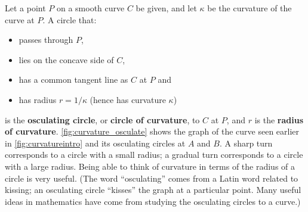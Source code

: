 Let a point $P$ on a smooth curve $C$  be given, and let $\kappa$ be the curvature of the curve at $P$. A circle that:
	\begin{itemize}
		\item passes through $P$,
		\item	lies on the concave side of $C$,
		\item	has a common tangent line as $C$ at $P$ and
%
%
		\item	has radius $r=1/\kappa$ (hence has curvature $\kappa$)
	\end{itemize}
is the \textbf{osculating circle}, or \textbf{circle of curvature}, to $C$ at $P$, and $r$ is the \textbf{radius of curvature}. %
\autoref{fig:curvature_osculate} shows the graph of the curve seen earlier in \autoref{fig:curvatureintro} and its osculating circles at $A$ and $B$. A sharp turn corresponds to a circle with a small radius; a gradual turn corresponds to a circle with a large radius. Being able to think of curvature in terms of the radius of a circle is very useful. (The word ``osculating'' comes from a Latin word related to kissing; an osculating circle ``kisses'' the graph at a particular point. Many useful ideas in mathematics have come from studying the osculating circles to a curve.)

